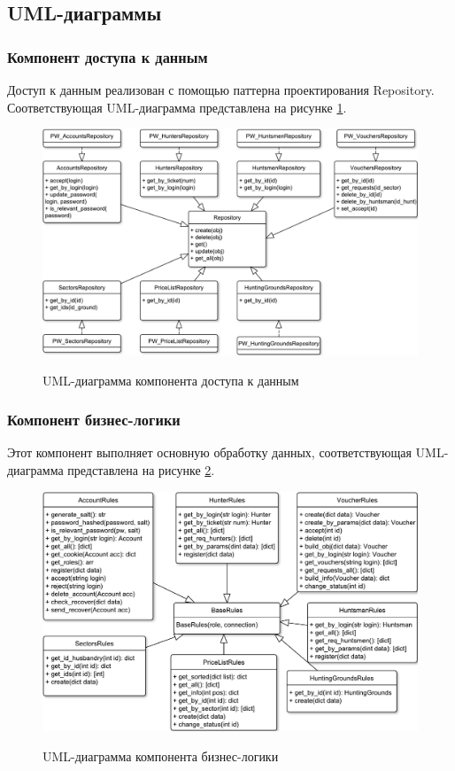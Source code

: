 	\subsection{UML-диаграммы}
		\subsubsection{Компонент доступа к данным}
		Доступ к данным реализован с помощью паттерна проектирования Repository. Соответствующая UML-диаграмма представлена на рисунке \ref{fig6:image}.
		
		\begin{figure}[ph!]
			\centering
			\begin{center}
				{\includegraphics[scale=0.6]{schemes/uml_access_rep.pdf}}
				\caption{UML-диаграмма компонента доступа к данным}
				\label{fig6:image}
			\end{center}
		\end{figure}
		\newpage
	
		\subsubsection{Компонент бизнес-логики}
		Этот компонент выполняет основную обработку данных, соответствующая UML-диаграмма представлена на рисунке \ref{fig7:image}.
		
		\begin{figure}[ph!]
			\centering
			\begin{center}
				{\includegraphics[scale=0.6]{schemes/uml_business.pdf}}
				\caption{UML-диаграмма компонента бизнес-логики}
				\label{fig7:image}
			\end{center}
		\end{figure}
	
